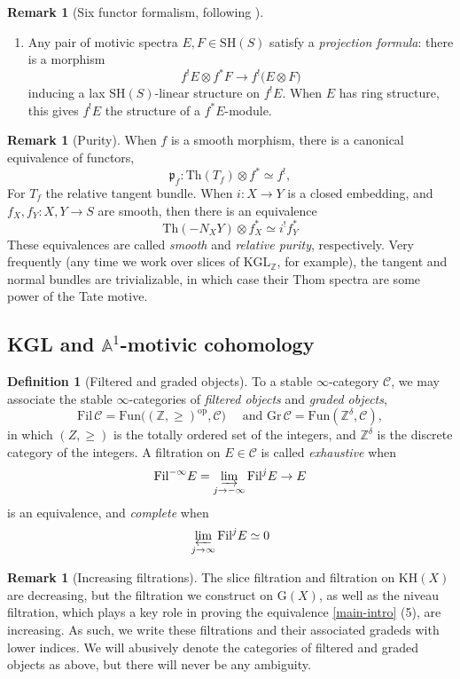 \documentclass[11pt, twoside]{article}
\numberwithin{equation}{section}
\theoremstyle{definition}
\newtheorem{definition}[equation]{Definition}
\newtheorem{remark}[equation]{Remark}
\newcommand{\bb}[1]{\mathbb{#1}}
\newcommand{\p}{\mathfrak{p}}
\newcommand{\colim}{\varinjlim}
\newcommand{\catlim}{\varprojlim}
\newcommand{\fil}{\mathrm{Fil}}
\newcommand{\Kgl}{\mathrm{KGL}}
\newcommand{\sh}{\mathrm{SH}}
\newcommand{\fun}{\mathrm{Fun}}
\newcommand{\G}{\mathrm{G}}
\newcommand{\KH}{\mathrm{KH}}
\newcommand{\op}{\mathrm{op}}
\begin{document}
\begin{remark}[Six functor formalism, following \cite{AY1, AY2}]
\begin{enumerate}
\item Any pair of motivic spectra \(E, F \in \sh(S)\) satisfy a \emph{projection formula}: there is a morphism 
\[f^!E \otimes f^*F \to f^!\big(E \otimes F\big)\]
inducing a lax \(\sh(S)\)-linear structure on \(f^!E\). When \(E\) has ring structure, this gives \(f^!E\) the structure of a \(f^*E\)-module.

\end{enumerate}
\end{remark}

\begin{remark}[Purity]
When \(f\) is a smooth morphism, there is a canonical equivalence of functors, 
\[\p_f \colon \mathrm{Th}(T_f) \otimes f^* \simeq f^!,\]
For \(T_f\) the relative tangent bundle. When \(i \colon X \to Y\) is a closed embedding, and \(f_X, f_Y \colon X, Y \to S\) are smooth, then there is an equivalence 
\[\mathrm{Th}(- N_X Y) \otimes f_X^* \simeq i^! f_Y^*\]
These equivalences are called \emph{smooth} and \emph{relative purity}, respectively. Very frequently (any time we work over slices of \(\Kgl_\bb{Z}\), for example), the tangent and normal bundles are trivializable, in which case their Thom spectra are some power of the Tate motive.
\end{remark}

\subsection{KGL and \(\bb{A}^1\)-motivic cohomology}

\begin{definition}[Filtered and graded objects]
To a stable \(\infty\)-category \(\mathcal{C}\), we may associate the stable \(\infty\)-categories of \emph{filtered objects} and \emph{graded objects}, 
\[\fil \, \mathcal{C} = \fun\big((\bb{Z}, \geq)^\op, \mathcal{C}\big) \quad \text{ and } \mathrm{Gr} \, \mathcal{C} = \fun(\bb{Z}^\delta, \mathcal{C}),\]
in which \((Z, \geq)\) is the totally ordered set of the integers, and \(\bb{Z}^\delta\) is the discrete category of the integers. A filtration on \(E \in \mathcal{C}\) is called \emph{exhaustive} when 
\[\fil^{- \infty} E = \colim_{j \to - \infty} \fil^j E \to E\]
is an equivalence, and \emph{complete} when 
\[\catlim_{j \to \infty} \fil^j E \simeq 0\]
\end{definition}

\begin{remark}[Increasing filtrations]
The slice filtration and filtration on \(\KH(X)\) are decreasing, but the filtration we construct on \(\G(X)\), as well as the niveau filtration, which plays a key role in proving the equivalence \ref{main-intro} (5), are increasing. As such, we write these filtrations and their associated gradeds with lower indices. We will abusively denote the categories of filtered and graded objects as above, but there will never be any ambiguity.
\end{remark}
\end{document}
